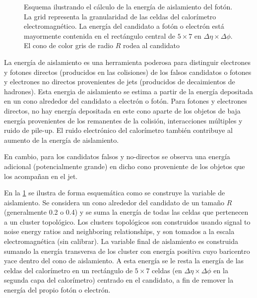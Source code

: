 


\begin{figure}[!htbp]
  \centering

  \resizebox{0.5\textwidth}{!}{
    
  }

  \caption{Esquema ilustrando el cálculo de la energía de aislamiento del fotón. La grid representa
    la granularidad de las celdas del calorímetro electromagnético. La energía del candidato a fotón o electrón
    está mayormente contenida en el rectángulo central de $5 \times 7$ en $\Delta\eta \times \Delta\phi$. El
    cono de color gris de radio $R$ rodea al candidato}
  \label{fig:topoetcone}

\end{figure}


La energía de aislamiento es una herramienta poderosa para distinguir electrones
y fotones directos (producidos en las colisiones) de los falsos candidatos o
fotones y electrones no directos provenientes de jets (producidos de
decaimientos de hadrones). Esta energia de aislamiento se estima a partir de la energía depositada en un
cono alrededor del candidato a electrón o fotón. Para fotones y electrones
directos, no hay energía depositada en este cono aparte de los objetos de baja
energía provenientes de los remanentes de la colisión, interacciones múltiples y
ruido de pile-up. El ruido electrónico del calorímetro también contribuye al
aumento de la energía de aislamiento.

En cambio, para los candidatos falsos y no-directos se observa una energía adicional
(potencialmente grande) en dicho cono proveniente de los objetos que los acompañan en el jet.

En la \cref{fig:topoetcone} se ilustra de forma esquemática como se construye
la variable de aislamiento. Se considera un cono alrededor del candidato
de un tamaño $R$ (generalmente 0.2 o 0.4) y se suma la energía de todas las
celdas que pertenecen a un cluster topológico. Los clusters topológicos son
construidos usando signal to noise energy ratios and neighboring relationships,
y son tomados a la escala electromagnética (sin calibrar). La variable final de
aislamiento es construida sumando la energía transversa de los cluster con
energía positiva cuyo baricentro yace dentro del cono de aislamiento. A esta
energía se le resta la energía de las celdas del calorímetro en un rectángulo de
$5\times 7$ celdas (en $\Delta\eta \times \Delta\phi$ en la segunda capa del
calorímetro) centrado en el candidato, a fin de remover la energía del propio
fotón o electrón.

